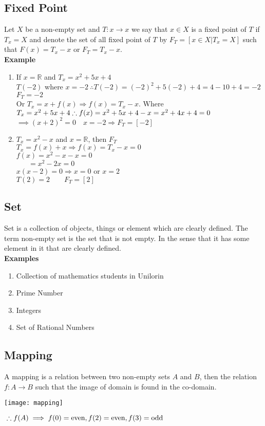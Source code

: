 \documentclass{report}
\newcommand{\bt}[1]{\textbf{#1}}
\newcommand{\sps}{\\[0.2cm]}
\newcommand{\NI}{\noindent}
\newcommand{\real}{\mathbb{R}}
\begin{document}
	\subsection*{Fixed Point}
	Let $X$ be a non-empty set and $T:x\rightarrow x$ we say that $x\in X$ is a fixed point of $T$ if $T_x = X$ and denote the set of all fixed point of $T$ by $F_T = [x\in X | T_x = X]$ such that $F(x)=T_x - x$ or $F_T = T_x - x$.\sps
	
	\NI\bt{Example}
	\begin{enumerate}
		\item If $x=\real$ and $T_x = x^2 + 5x + 4$\sps
		$T(-2)$ where $x=-2~ \therefore T(-2) = (-2)^2 + 5(-2) + 4 = 4-10 + 4 = -2$\\
		$F_T=-2$\\
		Or $T_x = x + f(x) \Rightarrow f(x) = T_x - x$. Where $T_x=x^2 + 5x + 4\sps\therefore f(x)=x^2 + 5x + 4 - x = x^2 + 4x + 4 = 0$\sps
		$\implies (x+2)^2 = 0\quad x=-2 \Rightarrow F_T = [-2]$\sps
		\item $T_x = x^2 - x$ and $x=\real$, then $F_T$\\
		$T_x = f(x) + x \Rightarrow f(x) = T_x -x = 0$\sps
		$f(x) = x^2 - x -x = 0$\\
		${~}~~\quad=x^2 - 2x = 0$\\
		$x(x-2) = 0 \Rightarrow x = 0$ or $x=2$\sps
		$T(2)=2~~~~~~~~~ F_T = [2]$
	\end{enumerate}
	
	\subsection*{Set}
	Set is a collection of objects, things or element which are clearly defined. The term non-empty set is the set that is not empty. In the sense that it has some element in it that are clearly defined.\sps
	
	\NI\bt{Examples}
	\begin{enumerate}
		\item Collection of mathematics students in Unilorin
		\item Prime Number
		\item Integers
		\item Set of Rational Numbers
	\end{enumerate}
	
	\subsection*{Mapping}
	A mapping is a relation between two non-empty sets $A$ and $B$, then the relation $f:A\rightarrow B$ such that the image of domain is found in the co-domain.\\
	\begin{center}
		\texttt{[image: mapping]}
	\end{center}
	$\\\therefore f(A) \implies f(0) = \text{even}, f(2)=\text{even}, f(3)=\text{odd}$
	
\end{document}
